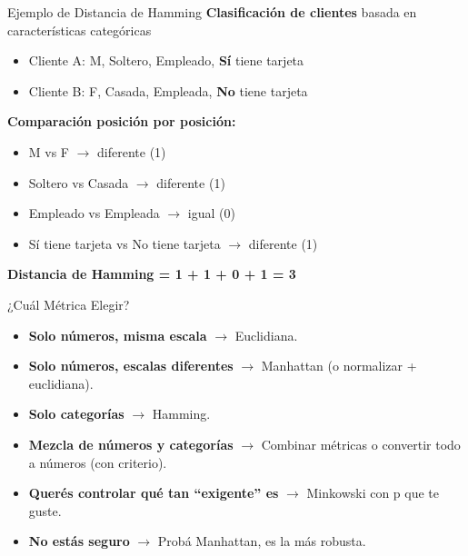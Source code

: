 \documentclass{beamer}
\begin{document}
\begin{frame}{Ejemplo de Distancia de Hamming}
    \textbf{Clasificación de clientes} basada en características categóricas
    
    \begin{itemize}
        \item Cliente A: M, Soltero, Empleado, \textbf{Sí} tiene tarjeta
        \item Cliente B: F, Casada, Empleada, \textbf{No} tiene tarjeta
    \end{itemize}
    
    \vspace{0.3cm}
    
    \textbf{Comparación posición por posición:}
    \begin{itemize}
        \item M vs F $\rightarrow$ diferente (1)
        \item Soltero vs Casada $\rightarrow$ diferente (1)
        \item Empleado vs Empleada $\rightarrow$ igual (0)
        \item Sí tiene tarjeta vs No tiene tarjeta $\rightarrow$ diferente (1)
    \end{itemize}
    
    \vspace{0.3cm}
    
    \textbf{Distancia de Hamming = 1 + 1 + 0 + 1 = 3}
\end{frame}

\begin{frame}{¿Cuál Métrica Elegir?}
    \begin{itemize}
        \item \textbf{Solo números, misma escala} $\rightarrow$ Euclidiana.
        \item \textbf{Solo números, escalas diferentes} $\rightarrow$ Manhattan (o normalizar + euclidiana).
        \item \textbf{Solo categorías} $\rightarrow$ Hamming.
        \item \textbf{Mezcla de números y categorías} $\rightarrow$ Combinar métricas o convertir todo a números (con criterio).
        \item \textbf{Querés controlar qué tan ``exigente'' es} $\rightarrow$ Minkowski con p que te guste.
        \item \textbf{No estás seguro} $\rightarrow$ Probá Manhattan, es la más robusta.
    \end{itemize}
\end{frame}
\end{document}
